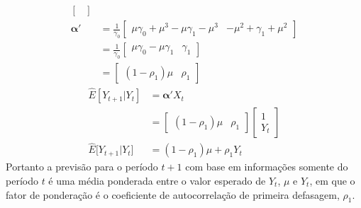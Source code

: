 \begin{enumerate}
\begin{align*}
\begin{bmatrix}
		\end{bmatrix}\\
		\boldsymbol{\alpha}'&=
		\frac{1}{\gamma_0}
		\begin{bmatrix}
		\mu\gamma_0+\mu^3-\mu\gamma_1-\mu^3&-\mu^2+\gamma_1+\mu^2
		\end{bmatrix}\\
		&=\frac{1}{\gamma_0}
		\begin{bmatrix}
		\mu\gamma_0-\mu\gamma_1&\gamma_1
		\end{bmatrix}\\
		&=\begin{bmatrix}
		(1-\rho_1)\mu&\rho_1
		\end{bmatrix}
	\end{align*}
	\begin{align*}
	\hat{E}[Y_{t+1}|Y_t]&=\boldsymbol{\alpha}'X_t\\
&=\begin{bmatrix}
(1-\rho_1)\mu&\rho_1
\end{bmatrix}
	\begin{bmatrix}
	1\\
	Y_t
	\end{bmatrix}\\
	\hat {E}\big[Y_{t+1}|Y_t\big]&=(1-\rho_1)\mu+\rho_1Y_t
	\end{align*}
	Portanto a previsão para o período $t+1$ com base em informações somente do período $t$ é uma média ponderada entre o valor esperado de $Y_t$, $\mu$ e $Y_t$, em que o fator de ponderação é o coeficiente de autocorrelação de primeira defasagem, $\rho_1$.
\end{enumerate}
